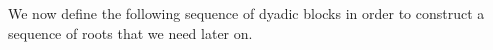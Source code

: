 \documentclass[12pt,reqno]{amsart}
\theoremstyle{plain}
\theoremstyle{definition}
\theoremstyle{remark}
\numberwithin{equation}{section}
\begin{document}

%

We now define the following sequence of dyadic blocks 
in order to construct a sequence of roots that we need later on.
\end{document}
